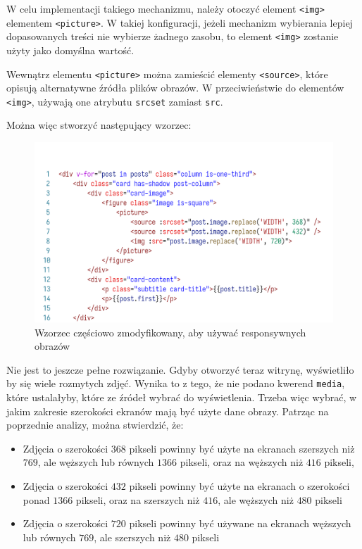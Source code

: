\documentclass[licencjacka]{pracadypl}
\begin{document}
W celu implementacji takiego mechanizmu, należy otoczyć element \texttt{<img>} elementem \texttt{<picture>}. W takiej konfiguracji, jeżeli mechanizm wybierania lepiej dopasowanych treści nie wybierze żadnego zasobu, to element \texttt{<img>} zostanie użyty jako domyślna wartość.

Wewnątrz elementu \texttt{<picture>} można zamieścić elementy \texttt{<source>}, które opisują alternatywne źródła plików obrazów. W przeciwieństwie do elementów \texttt{<img>}, używają one atrybutu \texttt{srcset} zamiast \texttt{src}.

Można więc stworzyć następujący wzorzec:

\begin{figure}[H]
  \includegraphics[width=\linewidth]{images/code-vue-image-card-mid.png}
  \caption{Wzorzec częściowo zmodyfikowany, aby używać responsywnych obrazów}
  \label{fig:code-vue-template-articles-mid}
\end{figure}

Nie jest to jeszcze pełne rozwiązanie. Gdyby otworzyć teraz witrynę, wyświetliło by się wiele rozmytych zdjęć. Wynika to z tego, że nie podano kwerend \texttt{media}, które ustalałyby, które ze źródeł wybrać do wyświetlenia. Trzeba więc wybrać, w jakim zakresie szerokości ekranów mają być użyte dane obrazy. Patrząc na poprzednie analizy, można stwierdzić, że:

\begin{itemize}
  \item Zdjęcia o szerokości $368$ pikseli powinny być użyte na ekranach szerszych niż $769$, ale węższych lub równych $1366$ pikseli, oraz na węższych niż $416$ pikseli,
  \item Zdjęcia o szerokości $432$ pikseli powinny być użyte na ekranach o szerokości ponad $1366$ pikseli, oraz na szerszych niż $416$, ale węższych niż $480$ pikseli
  \item Zdjęcia o szerokości $720$ pikseli powinny być używane na ekranach węższych lub równych $769$, ale szerszych niż $480$ pikseli
\end{itemize}
\end{document}
